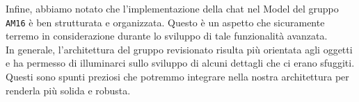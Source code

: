 \documentclass[12pt]{article}
\begin{document}
Infine, abbiamo notato che l'implementazione della chat nel Model del gruppo \texttt{AM16} è ben strutturata e organizzata. Questo è un aspetto che sicuramente terremo in considerazione durante lo sviluppo di tale funzionalità avanzata.\\
In generale, l'architettura del gruppo revisionato risulta più orientata agli oggetti e ha permesso di illuminarci sullo sviluppo di alcuni dettagli che ci erano sfuggiti. Questi sono spunti preziosi che potremmo integrare nella nostra architettura per renderla più solida e robusta.
\end{document}
